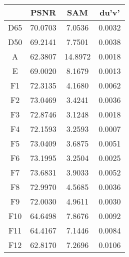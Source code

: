 \begin{tabular}{cccc}
  \hline
   & PSNR & SAM & du'v' \\
  \hline
  D65 & 70.0703 & 7.0536 & 0.0032 \\
  D50 & 69.2141 & 7.7501 & 0.0038 \\
  A & 62.3807 & 14.8972 & 0.0018 \\
  E & 69.0020 & 8.1679 & 0.0013 \\
  F1 & 72.3135 & 4.1680 & 0.0062 \\
  F2 & 73.0469 & 3.4241 & 0.0036 \\
  F3 & 72.8746 & 3.1248 & 0.0018 \\
  F4 & 72.1593 & 3.2593 & 0.0007 \\
  F5 & 73.0409 & 3.6875 & 0.0051 \\
  F6 & 73.1995 & 3.2504 & 0.0025 \\
  F7 & 73.6831 & 3.9033 & 0.0052 \\
  F8 & 72.9970 & 4.5685 & 0.0036 \\
  F9 & 72.0030 & 4.9611 & 0.0030 \\
  F10 & 64.6498 & 7.8676 & 0.0092 \\
  F11 & 64.4167 & 7.1446 & 0.0084 \\
  F12 & 62.8170 & 7.2696 & 0.0106 \\
  \hline
\end{tabular}
